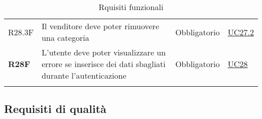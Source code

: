 \begin{center}
\begin{longtable}[!h]{p{50px} p{245px} p{75px} p{50px}}
        R28.3F                                & Il venditore deve poter rimuovere una categoria                                                     & Obbligatorio             & \hyperref[sec:UC27.2]{UC27.2}                \\
        \textbf{R28F}                         & L'utente deve poter visualizzare un errore se inserisce dei dati sbagliati durante l'autenticazione & Obbligatorio             & \hyperref[sec:UC28]{UC28}                    \\
        \rowcolor{white}\caption{Rquisiti funzionali}\\
    \end{longtable}
\end{center}

\newpage
\subsection{Requisiti di qualità}
